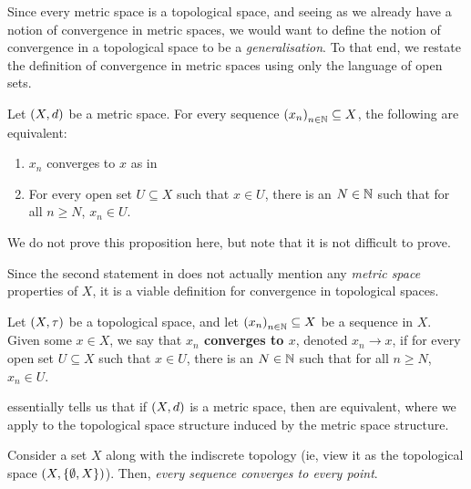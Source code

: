 Since every metric space is a topological space, and seeing as we already have a notion of convergence in metric spaces, we would want to define the notion of convergence in a topological space to be a \textit{generalisation}. To that end, we restate the definition of convergence in metric spaces using only the language of open sets.

\begin{boxproposition}\label{Ch1:Prop:Convergence_Metric_Topological}
    Let $\left( X, d \right)$ be a metric space. For every sequence $\left( x_n \right)_{n \in \mathbb{N}} \subseteq X$, the following are equivalent:
    \begin{enumerate}[label = \normalfont \arabic*.]
        \item $x_n$ converges to $x$ as in 
        \item For every open set $U \subseteq X$ such that $x \in U$, there is an $N \in \mathbb{N}$ such that for all $n \geq N$, $x_n \in U$.
    \end{enumerate}
\end{boxproposition}

We do not prove this proposition here, but note that it is not difficult to prove.

Since the second statement in  does not actually mention any \textit{metric space} properties of $X$, it is a viable definition for convergence in topological spaces.

\begin{boxdefinition}\label{Ch1:Def:Convergence_Topological}
    Let $\left( X, \tau \right)$ be a topological space, and let $\left( x_n \right)_{n \in \mathbb{N}} \subseteq X$ be a sequence in $X$. Given some $x \in X$, we say that \textbf{$x_n$ converges to $x$}, denoted $x_n \to x$, if for every open set $U \subseteq X$ such that $x \in U$, there is an $N \in \mathbb{N}$ such that for all $n \geq N$, $x_n \in U$.
\end{boxdefinition}

 essentially tells us that if $\left( X, d \right)$ is a metric space, then  are equivalent, where we apply  to the topological space structure induced by the metric space structure.

\begin{boxexample}\label{Ch1:Eg:Indiscrete_Top_not_Hausdorff}
    Consider a set $X$ along with the indiscrete topology (ie, view it as the topological space $\left( X, \left\{ \emptyset, X \right\} \right)$). Then, \textit{every sequence converges to every point}.
\end{boxexample}

